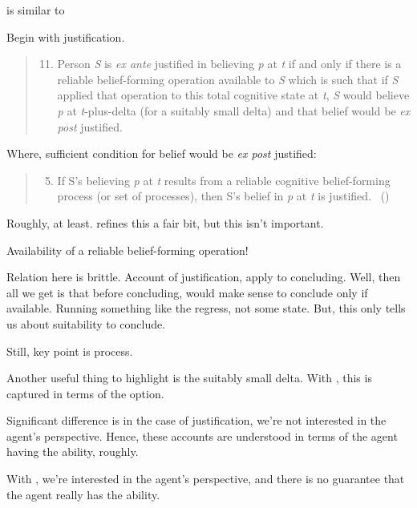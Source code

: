 \begin{note}
  \citeauthor{Turri:2010aa} is similar to \citeauthor{Goldman:1979ui}

  Begin with justification.


  \begin{quote}
    \begin{enumerate}[label=(\arabic*)]
      \setcounter{enumi}{10}
    \item
      Person \emph{S} is \emph{ex ante} justified in believing \emph{p} at \emph{t} if and only if there is a reliable belief-forming operation available to \emph{S} which is such that if \emph{S} applied that operation to this total cognitive state at \emph{t}, \emph{S} would believe \emph{p} at \emph{t}-plus-delta (for a suitably small delta) and that belief would be \emph{ex post} justified.
    \end{enumerate}
  \end{quote}

  Where, sufficient condition for belief would be \emph{ex post} justified:
  \begin{quote}
    \begin{enumerate}[label=(\arabic*)]
      \setcounter{enumi}{4}
    \item
      If S's believing \emph{p} at \emph{t} results from a reliable cognitive belief-forming process (or set of processes), then S's belief in \emph{p} at \emph{t} is justified.%
      \mbox{ }\hfill\mbox{(\citeyear[13]{Goldman:1979ui})}
    \end{enumerate}
  \end{quote}
  Roughly, at least.
  \citeauthor{Goldman:1979ui} refines this a fair bit, but this isn't important.

  Availability of a reliable belief-forming operation!

  Relation here is brittle.
  Account of justification, apply to concluding.
  Well, then all we get is that before concluding, would make sense to conclude only if available.
  Running something like the \citeauthor{Carroll:1895uj} regress, not some state.
  But, this only tells us about suitability to conclude.

  Still, key point is process.

  Another useful thing to highlight is the suitably small delta.
  With \requ{}, this is captured in terms of the option.
\end{note}

\begin{note}
  Significant difference is in the case of justification, we're not interested in the agent's perspective.
  Hence, these accounts are understood in terms of the agent having the ability, roughly.

  With \qzS{}, we're interested in the agent's perspective, and there is no guarantee that the agent really has the ability.
\end{note}

